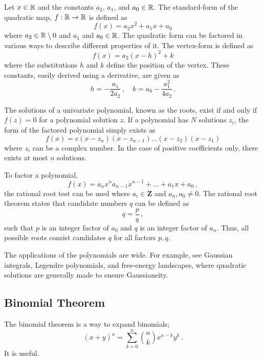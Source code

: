 \begin{definition}
    Let $x\in\mathbb{R}$ and the constants $a_2$, $a_1$, and $a_0 \in \mathbb{R}$. The standard-form of the quadratic map, $f:\mathbb{R} \rightarrow \mathbb{R}$ is defined as
    \begin{equation}
        f(x) = a_2x^2 + a_1 x + a_0
    \end{equation}
    where $a_2 \in \mathbb{R} \setminus 0$ and $a_1$ and $a_0 \in \mathbb{R}$. The quadratic form can be factored in various ways to describe different properties of it. The vertex-form is defined as
    \begin{equation}
        f(x) = a_2(x-h)^2 + k
    \end{equation}
    where the substitutions $h$ and $k$ define the position of the vertex. These constants, easily derived using a derivative, are given as
    \begin{equation}
        h = -\frac{a_1}{2a_2}\,, \quad k = a_0 - \frac{a_1^2}{4a_2}\,.
    \end{equation}
\end{definition} 

The solutions of a univariate polynomial, known as the roots, exist if and only if $f(z) = 0$ for a polynomial solution $z$. If a polynomial has $N$ solutions $z_i$, the form of the factored polynomial simply exists as
\begin{equation}
    f(x) = c(x-z_n)(x-z_{n-1}) \dots (x-z_2)(x-z_1)
\end{equation}
where $z_i$ can be a complex number. In the case of positive coefficients only, there exists at most $n$ solutions. 

To factor a polynomial, 
\begin{equation}
f(x) = a_n x^n a_{n-1}x^{n-1}+ \dots +a_1 x + a_0\,,
\end{equation}
the rational root test can be used where $a_i \in \mathbf{Z}$ and $a_n, a_0 \neq 0$. The rational root theorem states that candidate numbers $q$ can be defined as 
\begin{equation}
    q = \frac{p}{q}\,,
\end{equation}
such that $p$ is an integer factor of $a_0$ and $q$ is an integer factor of $a_n$. Thus, all possible roots consist candidates $q$ for all factors $p, q$.

The applications of the polynomials are wide. For example, see Gaussian integrals, Legendre polynomials, and free-energy landscapes, where quadratic solutions are generally made to ensure Gaussianeity.


\subsection{Binomial Theorem}

The binomial theorem is a way to expand binomials;
\begin{equation}
    (x+y)^n = \sum_{k=0}^{n}\binom{n}{k}x^{n-k} y^{k}\,.
\end{equation}
It is useful. 
